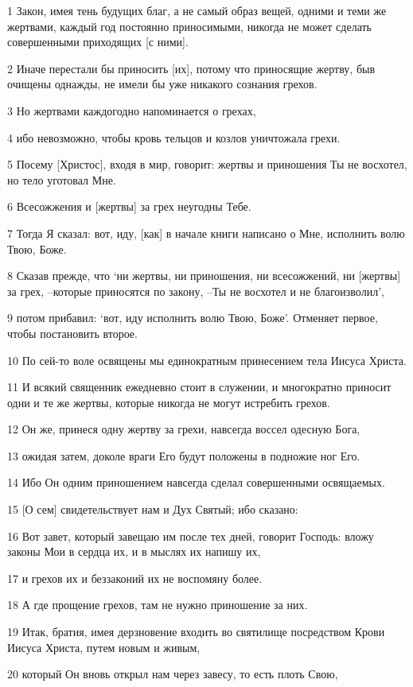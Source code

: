 \par 1 Закон, имея тень будущих благ, а не самый образ вещей, одними и теми же жертвами, каждый год постоянно приносимыми, никогда не может сделать совершенными приходящих [с ними].
\par 2 Иначе перестали бы приносить [их], потому что приносящие жертву, быв очищены однажды, не имели бы уже никакого сознания грехов.
\par 3 Но жертвами каждогодно напоминается о грехах,
\par 4 ибо невозможно, чтобы кровь тельцов и козлов уничтожала грехи.
\par 5 Посему [Христос], входя в мир, говорит: жертвы и приношения Ты не восхотел, но тело уготовал Мне.
\par 6 Всесожжения и [жертвы] за грех неугодны Тебе.
\par 7 Тогда Я сказал: вот, иду, [как] в начале книги написано о Мне, исполнить волю Твою, Боже.
\par 8 Сказав прежде, что `ни жертвы, ни приношения, ни всесожжений, ни [жертвы] за грех, --которые приносятся по закону, --Ты не восхотел и не благоизволил',
\par 9 потом прибавил: `вот, иду исполнить волю Твою, Боже'. Отменяет первое, чтобы постановить второе.
\par 10 По сей-то воле освящены мы единократным принесением тела Иисуса Христа.
\par 11 И всякий священник ежедневно стоит в служении, и многократно приносит одни и те же жертвы, которые никогда не могут истребить грехов.
\par 12 Он же, принеся одну жертву за грехи, навсегда воссел одесную Бога,
\par 13 ожидая затем, доколе враги Его будут положены в подножие ног Его.
\par 14 Ибо Он одним приношением навсегда сделал совершенными освящаемых.
\par 15 [О сем] свидетельствует нам и Дух Святый; ибо сказано:
\par 16 Вот завет, который завещаю им после тех дней, говорит Господь: вложу законы Мои в сердца их, и в мыслях их напишу их,
\par 17 и грехов их и беззаконий их не воспомяну более.
\par 18 А где прощение грехов, там не нужно приношение за них.
\par 19 Итак, братия, имея дерзновение входить во святилище посредством Крови Иисуса Христа, путем новым и живым,
\par 20 который Он вновь открыл нам через завесу, то есть плоть Свою,
